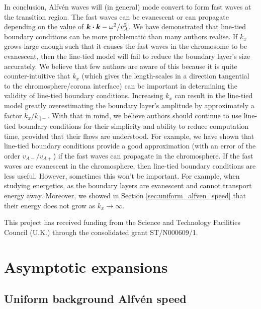 \documentclass[linenumbers]{aastex63}
\let\vec\boldsymbol
\begin{document}
In conclusion, Alfv\'en waves will (in general) mode convert to form fast waves at the transition region. The fast waves can be evanescent or can propagate depending on the value of $\vec{k}\vdot\vec{k} - \omega^2/v_A^2$. We have demonstrated that line-tied boundary conditions can be more problematic than many authors realise. If $k_x$ grows large enough such that it causes the fast waves in the chromosome to be evanescent, then the line-tied model will fail to reduce the boundary layer's size accurately. We believe that few authors are aware of this because it is quite counter-intuitive that $k_x$ (which gives the length-scales in a direction tangential to the chromosphere/corona interface) can be important in determining the validity of line-tied boundary conditions. Increasing $k_x$ can result in the line-tied model greatly overestimating the boundary layer's amplitude by approximately a factor $k_x / k_{||-}$. With that in mind, we believe authors should continue to use line-tied boundary conditions for their simplicity and ability to reduce computation time, provided that their flaws are understood. For example, we have shown that line-tied boundary conditions provide a good approximation (with an error of the order $v_{A-}/v_{A+}$) if the fast waves can propagate in the chromosphere. If the fast waves are evanescent in the chromosphere, then line-tied boundary conditions are less useful. However, sometimes this won't be important. For example, when studying energetics, as the boundary layers are evanescent and cannot transport energy away. Moreover, we showed in Section \ref{sec:uniform_alfven_speed} that their energy does not grow as $k_x\rightarrow \infty$.

\acknowledgments

This project has received funding from the Science and Technology Facilities Council (U.K.) through the consolidated grant ST/N000609/1.

\appendix

\section{Asymptotic expansions}
\label{adx:asymptotic_expansions}

\subsection{Uniform background Alfv\'en speed}
\label{adx:uniform_background_alfven_speed}
\end{document}
